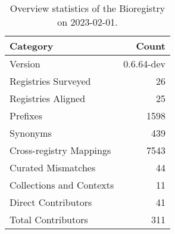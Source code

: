 \begin{table}
\centering
\caption{Overview statistics of the Bioregistry on 2023-02-01.}
\label{tab:bioregistry-summary}
\begin{tabular}{lr}
\toprule
                Category &      Count \\
\midrule
                 Version & 0.6.64-dev \\
     Registries Surveyed &         26 \\
      Registries Aligned &         25 \\
                Prefixes &       1598 \\
                Synonyms &        439 \\
 Cross-registry Mappings &       7543 \\
      Curated Mismatches &         44 \\
Collections and Contexts &         11 \\
     Direct Contributors &         41 \\
      Total Contributors &        311 \\
\bottomrule
\end{tabular}
\end{table}
